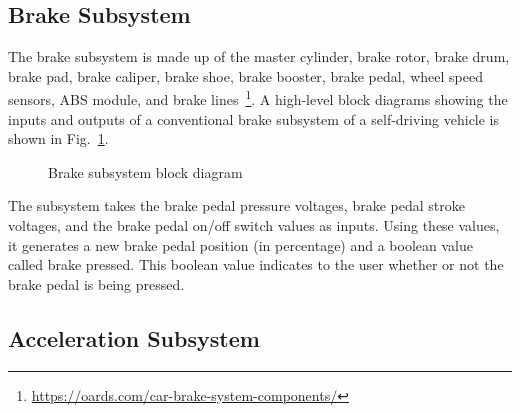 \documentclass[conference]{IEEEtran}
\begin{document}
  \subsection{Brake Subsystem}
  The brake subsystem is made up of the master cylinder, brake rotor, brake drum, brake pad, brake caliper, brake shoe, brake booster, brake pedal, wheel speed sensors, ABS module, and brake lines~\footnote{\url{https://oards.com/car-brake-system-components/}}. A high-level block diagrams showing the inputs and outputs of a conventional brake subsystem of a self-driving vehicle is shown in Fig.~\ref{fig:brakeModelArchitecture}. %
%
 \begin{figure}[htbp]
    \centering
    \caption{Brake subsystem block diagram}
    \label{fig:brakeModelArchitecture}
\end{figure}
%
The subsystem takes the brake pedal pressure voltages, brake pedal stroke voltages, and the brake pedal on/off switch values as inputs. Using these values, it generates a new brake pedal position (in percentage) and a boolean value called brake pressed. This boolean value indicates to the user whether or not the brake pedal is being pressed.

\subsection{Acceleration Subsystem}
\end{document}
